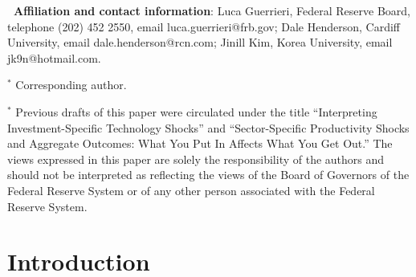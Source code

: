 \documentclass[12pt,fleqn]{article}
\renewcommand{\baselinestretch}{1.5}
\begin{document}
{\normalsize \vspace{1cm} }

\renewcommand{\baselinestretch}{1} {\footnotesize \noindent }

{\footnotesize \textbf{\ Affiliation and contact information}: Luca
Guerrieri, Federal Reserve Board, telephone (202) 452 2550, email
luca.guerrieri@frb.gov; Dale Henderson, Cardiff University, email
dale.henderson@rcn.com; Jinill Kim, Korea University, email
jk9n@hotmail.com. }

$^*$ Corresponding author.

{\footnotesize \vspace{2cm} }

{\footnotesize \noindent $^{*}$ Previous drafts of this paper were
circulated under the title ``Interpreting Investment-Specific Technology
Shocks'' and ``Sector-Specific Productivity Shocks and Aggregate Outcomes: What You Put In Affects What You Get Out.'' The views expressed in this paper are solely the responsibility of
the authors and should not be interpreted as reflecting the views of the
Board of Governors of the Federal Reserve System or of any other person
associated with the Federal Reserve System.  }

\clearpage \renewcommand{\baselinestretch}{1.5} \normalsize

\section{\protect\normalsize Introduction}
\end{document}
